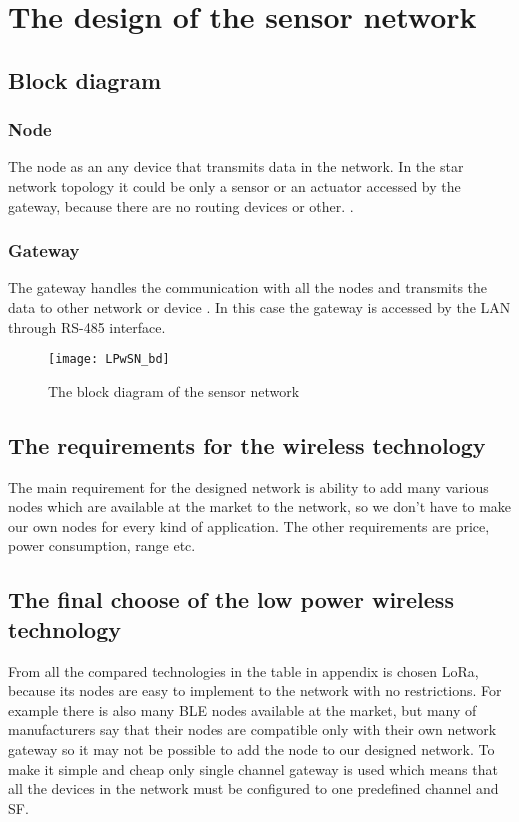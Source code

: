 \chapter{The design of the sensor network}

\section{Block diagram}
\subsection{Node}
The node as an any device that transmits data in the network. In the star network topology it could be only a sensor or an actuator accessed by the gateway, because there are no routing devices or other. \cite{wsn01}.
\subsection{Gateway}
The gateway handles the communication with all the nodes and transmits the data to other network or device \cite{wsn01}. 
In this case the gateway is accessed by the LAN through RS-485 interface. 
\begin{figure}[!h]
    \centering
    \texttt{[image: LPwSN\_bd]}
    \caption{The block diagram of the sensor network}
    \label{fig:Typical structure of a card}
\end{figure}


\section{The requirements for the wireless technology}
The main requirement for the designed network is ability to add many various nodes which are available at the market to the network, so we don't have to make our own nodes for every kind of application.
The other requirements are price, power consumption, range etc.


\section{The final choose of the low power wireless technology}
From all the compared technologies in the table in appendix is chosen LoRa, because its nodes are easy to implement to the network with no restrictions. For example there is also many BLE nodes available at the market, but many of manufacturers say that their nodes are compatible only with their own network gateway so it may not be possible to add the node to our designed network. 
To make it simple and cheap only single channel gateway is used which means that all the devices in the network must be configured to one predefined channel and SF. 
